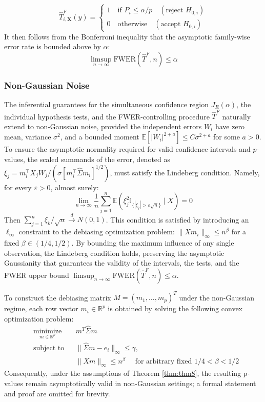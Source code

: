 \documentclass{article}
\begin{document}
\begin{equation}
\widehat{T}^F_{i, \mathbf{X}}(y) = \begin{cases}
1 \quad \text{if }P_i \le \alpha/p \quad (\text{reject } H_{0,i})\\
0 \quad \text{otherwise} \quad (\text{accept } H_{0,i})
\end{cases}
\end{equation}
It then follows from the Bonferroni inequality that the asymptotic family-wise error rate is bounded above by $\alpha$:
\begin{equation}
\limsup_{n\to\infty} \text{FWER}(\widehat{T}^F,n) \le \alpha    
\end{equation}
\subsubsection{Non-Gaussian Noise}
\label{sec:2.3.4}
The inferential guarantees for the simultaneous confidence region $J_R(\alpha)$, the individual hypothesis tests, and the FWER-controlling procedure $\widehat{T}^F$ naturally extend to non-Gaussian noise, provided the independent errors $W_i$ have zero mean, variance $\sigma^2$, and a bounded moment $\mathbb{E}[|W_i|^{2+a}] \le C\sigma^{2+a}$ for some $a > 0$. To ensure the asymptotic normality required for valid confidence intervals and $p$-values, the scaled summands of the error, denoted as $\xi_j=m_i^\top X_j W_j/(\sigma[m_i^\top \hat{\Sigma}m_i]^{1/2})$, must satisfy the Lindeberg condition. Namely, for every $\varepsilon > 0$, almost surely:
\begin{equation}
\lim_{n \to \infty} \frac{1}{n} \sum_{j=1}^n \mathbb{E}\left(\xi_j^2 \mathbb{I}_{\{|\xi_j| > \varepsilon\sqrt{n}\}} \mid X\right) = 0    
\end{equation}
Then $\sum_{j=1}^n \xi_k/\sqrt{n} \overset{d}\to N(0,1)$. This condition is satisfied by introducing an $\ell_\infty$ constraint to the debiasing optimization problem: $\|Xm_i\|_\infty \le n^\beta$ for a fixed $\beta \in (1/4, 1/2)$. By bounding the maximum influence of any single observation, the Lindeberg condition holds, preserving the asymptotic Gaussianity that guarantees the validity of the intervals, the tests, and the FWER upper bound $\limsup_{n\to\infty} \text{FWER}(\widehat{T}^F,n) \le \alpha$. 

To construct the debiasing matrix $M = (m_1, \dots, m_p)^T$ under the non-Gaussian regime, each row vector $m_i \in \mathbb{R}^p$ is obtained by solving the following convex optimization problem:
\begin{equation}
    \begin{aligned}
& \underset{m \in \mathbb{R}^p}{\text{minimize}} & & m^T \hat{\Sigma} m \\
& \text{subject to} & & \|\hat{\Sigma}m - e_i\|_\infty \le \gamma, \\
& & & \|Xm\|_\infty \le n^\beta \quad \text{ for arbitrary fixed } 1/4 <\beta<1/2
\end{aligned}
\end{equation}
Consequently, under the assumptions of Theorem \ref{thm:thm8}, the resulting p-values remain asymptotically valid in non-Gaussian settings; a formal statement and proof are omitted for brevity.
\end{document}
